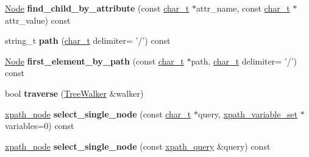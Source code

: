 \begin{DoxyCompactItemize}
\item 
\hypertarget{classphys_1_1xml_1_1Node_aa3ea620c51e0af54aebcf78586086a9a}{
\hyperlink{classphys_1_1xml_1_1Node}{Node} {\bfseries find\_\-child\_\-by\_\-attribute} (const \hyperlink{namespacephys_1_1xml_afc87705cd1c2917d87b879715a2d8f6e}{char\_\-t} $\ast$attr\_\-name, const \hyperlink{namespacephys_1_1xml_afc87705cd1c2917d87b879715a2d8f6e}{char\_\-t} $\ast$attr\_\-value) const }
\label{d7/d0a/classphys_1_1xml_1_1Node_aa3ea620c51e0af54aebcf78586086a9a}

\item 
\hypertarget{classphys_1_1xml_1_1Node_a74b9f51a6642808510e71f643cc861ad}{
string\_\-t {\bfseries path} (\hyperlink{namespacephys_1_1xml_afc87705cd1c2917d87b879715a2d8f6e}{char\_\-t} delimiter= '/') const }
\label{d7/d0a/classphys_1_1xml_1_1Node_a74b9f51a6642808510e71f643cc861ad}

\item 
\hypertarget{classphys_1_1xml_1_1Node_ad771e6d5faca7c608a6a6cd1e29dd3d8}{
\hyperlink{classphys_1_1xml_1_1Node}{Node} {\bfseries first\_\-element\_\-by\_\-path} (const \hyperlink{namespacephys_1_1xml_afc87705cd1c2917d87b879715a2d8f6e}{char\_\-t} $\ast$path, \hyperlink{namespacephys_1_1xml_afc87705cd1c2917d87b879715a2d8f6e}{char\_\-t} delimiter= '/') const }
\label{d7/d0a/classphys_1_1xml_1_1Node_ad771e6d5faca7c608a6a6cd1e29dd3d8}

\item 
\hypertarget{classphys_1_1xml_1_1Node_abf6c5b96ced5404a204a4700f044f982}{
bool {\bfseries traverse} (\hyperlink{classphys_1_1xml_1_1TreeWalker}{TreeWalker} \&walker)}
\label{d7/d0a/classphys_1_1xml_1_1Node_abf6c5b96ced5404a204a4700f044f982}

\item 
\hypertarget{classphys_1_1xml_1_1Node_a00f21e69b9a067e15f1f92b9b3e4ab13}{
\hyperlink{classphys_1_1xml_1_1xpath__node}{xpath\_\-node} {\bfseries select\_\-single\_\-node} (const \hyperlink{namespacephys_1_1xml_afc87705cd1c2917d87b879715a2d8f6e}{char\_\-t} $\ast$query, \hyperlink{classphys_1_1xml_1_1xpath__variable__set}{xpath\_\-variable\_\-set} $\ast$variables=0) const }
\label{d7/d0a/classphys_1_1xml_1_1Node_a00f21e69b9a067e15f1f92b9b3e4ab13}

\item 
\hypertarget{classphys_1_1xml_1_1Node_a6e63ac46658ba2484bf58d47f4fb4044}{
\hyperlink{classphys_1_1xml_1_1xpath__node}{xpath\_\-node} {\bfseries select\_\-single\_\-node} (const \hyperlink{classphys_1_1xml_1_1xpath__query}{xpath\_\-query} \&query) const }
\label{d7/d0a/classphys_1_1xml_1_1Node_a6e63ac46658ba2484bf58d47f4fb4044}


\end{DoxyCompactItemize}
